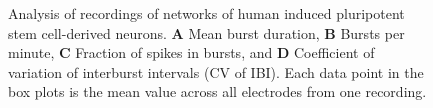 \documentclass[12pt, titlepage]{article}
\begin{document}
		\begin{figure}[h]
			\centering
			\caption{Analysis of recordings of networks of human induced pluripotent stem cell-derived neurons. \textbf{A} Mean burst duration, \textbf{B} Bursts per minute, \textbf{C} Fraction of spikes in bursts, and \textbf{D} Coefficient of variation of interburst intervals (CV of IBI). Each data point in the box plots is the mean value across all electrodes from one recording.}
			\label{hiPSN_results}
		\end{figure}
\end{document}
